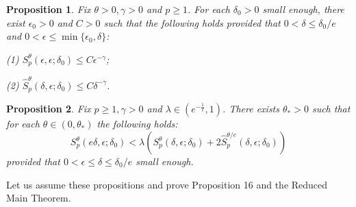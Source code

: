 \documentclass[11pt,oneside]{article}
\theoremstyle{plain}
\newtheorem{prop}{Proposition}
\numberwithin{equation}{section}
\numberwithin{figure}{section}
\numberwithin{table}{section}
\begin{document}
\begin{prop}
Fix $\theta > 0, \gamma > 0$ and $p \geq 1$. For each $\delta_0> 0$ small enough, there exist $\epsilon_0 >0$ and $C>0$ such that the following holds provided that $0 < \delta \leq \delta_0/e $ and $0 < \epsilon \leq \min\{\epsilon_0, \delta \}$:

(1) $S_p^{\theta} (\epsilon, \epsilon; \delta_0) \leq C \epsilon^{-\gamma} $;

(2) $\hat S_p^{\theta} (\delta, \epsilon; \delta_0) \leq C \delta^{-\gamma}$.

\end{prop}


\begin{prop}

Fix $p \geq 1, \gamma >0$ and $\lambda \in (e^{- \frac{1}{\ell}}, 1)$. There exists $\theta_* >0$ such that for each $\theta \in (0, \theta_*)$ the following holds:
\begin{equation}
S_p^{\theta} (e\delta, \epsilon; \delta_0) < \lambda( S_p^{\theta} (\delta, \epsilon; \delta_0) + 2 \hat S_p^{\theta/e} (\delta, \epsilon; \delta_0))
\end{equation}
provided that $0 < \epsilon \leq \delta \leq \delta_0/e$ small enough.

\end{prop}


Let us assume these propositions and prove Proposition 16 and the Reduced Main Theorem.
\end{document}

